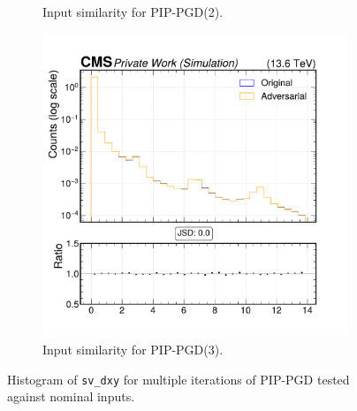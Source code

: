 \begin{figure}[htbp]
\begin{subfigure}[t]{0.32\textwidth}
    \caption*{Input similarity for PIP-PGD(2).}
  \end{subfigure}\hfill
  \begin{subfigure}[t]{0.32\textwidth}
    \includegraphics[width=\linewidth]{media/output/features/compare/combined_it_3/cmp_vtx_arr_sv_dxy.pdf}
    \caption*{Input similarity for PIP-PGD(3).}
  \end{subfigure}

  \caption*{Histogram of \texttt{sv\_dxy} for multiple iterations of PIP-PGD tested against nominal inputs.}
  \label{fig:combined_input_sv_dxy}
\end{figure}

